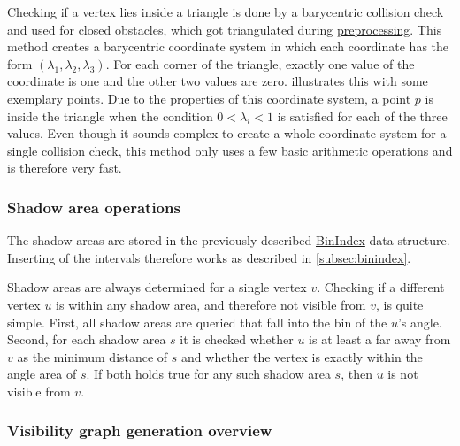 			Checking if a vertex lies inside a triangle is done by a barycentric collision check and used for closed obstacles, which got triangulated during \hyperref[subsec:step-1-preprocessing]{preprocessing}.
			This method creates a barycentric coordinate system in which each coordinate has the form $(\lambda_1,\lambda_2,\lambda_3)$.
			For each corner of the triangle, exactly one value of the coordinate is one and the other two values are zero.
			 illustrates this with some exemplary points.
			Due to the properties of this coordinate system, a point $p$ is inside the triangle when the condition $0 < \lambda_i < 1$ is satisfied for each of the three values.
			Even though it sounds complex to create a whole coordinate system for a single collision check, this method only uses a few basic arithmetic operations and is therefore very fast.
			
		\subsubsection{Shadow area operations}
			
			The shadow areas are stored in the previously described \hyperref[subsec:binindex]{BinIndex} data structure.
			Inserting of the intervals therefore works as described in \cref{subsec:binindex}.
			
			Shadow areas are always determined for a single vertex $v$.
			Checking if a different vertex $u$ is within any shadow area, and therefore not visible from $v$, is quite simple.
			First, all shadow areas are queried that fall into the bin of the $u$'s angle.
			Second, for each shadow area $s$ it is checked whether $u$ is at least a far away from $v$ as the minimum distance of $s$ and whether the vertex is exactly within the angle area of $s$.
			If both holds true for any such shadow area $s$, then $u$ is not visible from $v$.
		
		\subsubsection{Visibility graph generation overview}
		
